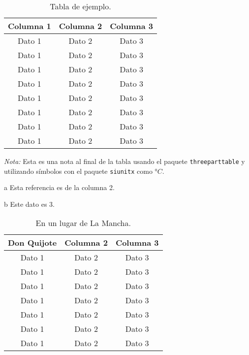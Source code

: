 \begin{table}[!ht]
  \caption{Tabla de ejemplo.}
  \centering
  \begin{threeparttable}
  \begin{tabular}{ccc}

    \toprule
    \textbf{Columna 1} & \textbf{Columna 2}\tnote{a} & \textbf{Columna 3}\\
    \midrule
    Dato 1             & Dato 2             & Dato 3\\
    Dato 1             & Dato 2             & Dato 3\\
    Dato 1             & Dato 2             & Dato 3\\
    Dato 1             & Dato 2             & Dato 3\\
    Dato 1             & Dato 2             & Dato 3\\
    Dato 1             & Dato 2             & Dato 3\\
    Dato 1             & Dato 2             & Dato 3\\
    Dato 1             & Dato 2             & Dato 3\tnote{b}\\
    \bottomrule

  \end{tabular}
  \begin{tablenotes}
    \item \emph{Nota:} Esta es una nota al final de la tabla usando el paquete \texttt{threeparttable} y utilizando símbolos con el paquete \verb|siunitx| como \si{\degree}$C$.
    \item [a] Esta referencia es de la columna 2.
    \item [b] Este dato es 3.
  \end{tablenotes}
  \end{threeparttable}
  \label{tab:ejemplo4}
  \end{table}


\begin{table}[!ht]
  \caption{En un lugar de La Mancha.}
  \centering
  \begin{tabular}{ccc}

  \toprule
  \textbf{Don Quijote} & \textbf{Columna 2} & \textbf{Columna 3}\\
  \midrule
  Dato 1             & Dato 2             & Dato 3\\
  Dato 1             & Dato 2             & Dato 3\\
  Dato 1             & Dato 2             & Dato 3\\
  Dato 1             & Dato 2             & Dato 3\\
  Dato 1             & Dato 2             & Dato 3\\
  Dato 1             & Dato 2             & Dato 3\\
  Dato 1             & Dato 2             & Dato 3\\
  \bottomrule

  \end{tabular}
  \label{tab:quijote}
\end{table}


